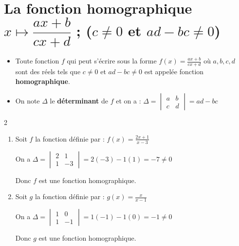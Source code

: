 \section{La fonction homographique $x \mapsto \dfrac{ax+b}{cx+d}$ ; ($c \neq 0$ et $ad-bc \neq 0$)}

\begin{Definition}
\begin{itemize}
    \item Toute fonction $f$ qui peut s'écrire sous la forme $f(x) = \frac{ax+b}{cx+d}$ où $a, b, c, d$ sont des réels tels que $c \neq 0$ et $ad-bc \neq 0$ est appelée fonction \textbf{homographique}.
    \item On note $\Delta$ le \textbf{déterminant} de $f$ et on a : $\Delta = \begin{vmatrix} a & b \\ c & d \end{vmatrix} = ad - bc$
\end{itemize}
\end{Definition}

\begin{Exemple}
\begin{multicols}{2}
\begin{enumerate}
    \item Soit $f$ la fonction définie par : $f(x) = \frac{2x+1}{x-3}$
    
    On a $\Delta = \begin{vmatrix} 2 & 1 \\ 1 & -3 \end{vmatrix} = 2(-3) - 1(1) = -7 \neq 0$
    
    Donc $f$ est une fonction homographique.

\columnbreak
    
    \item Soit $g$ la fonction définie par : $g(x) = \frac{x}{x-1}$
    
    On a  $\Delta = \begin{vmatrix} 1 & 0 \\ 1 & -1 \end{vmatrix} = 1(-1) - 1(0) = -1 \neq 0$
    
    Donc $g$ est une fonction homographique.
\end{enumerate}
\end{multicols}
\end{Exemple}



